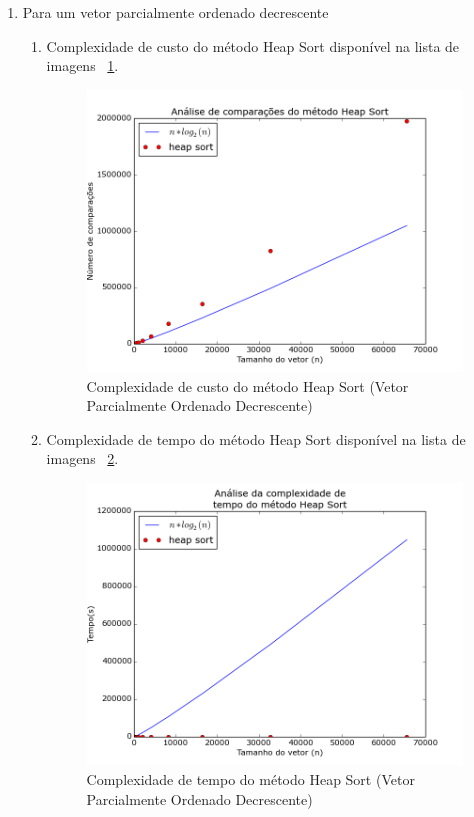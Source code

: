 \documentclass[12pt,a4paper,twoside]{report}
\begin{document}
\begin{enumerate}
			
			\item Para um vetor parcialmente ordenado decrescente
										\begin{enumerate}
											\item Complexidade de custo do método Heap Sort disponível na lista de imagens ~\ref{fig:HeapPlot1POD}.
											\begin{figure}[!h]
												\centering
												\includegraphics[scale=0.6]{../imagens/Heap/heap_plot_1_parcialmente_ordenado_decrescente.png}
												\caption{Complexidade de custo do método Heap Sort (Vetor Parcialmente Ordenado Decrescente) \label{fig:HeapPlot1POD}}
											\end{figure}
											
											
											\item Complexidade de tempo do método Heap Sort disponível na lista de imagens ~\ref{fig:HeapPlot2POD}.
											\begin{figure}[!h]
												\centering
												\includegraphics[scale=0.6]{../imagens/Heap/heap_plot_2_parcialmente_ordenado_decrescente.png}
												\caption{Complexidade de tempo do método Heap Sort (Vetor Parcialmente Ordenado Decrescente) \label{fig:HeapPlot2POD}}
											\end{figure}
											

\end{enumerate}
\end{enumerate}
\end{document}
